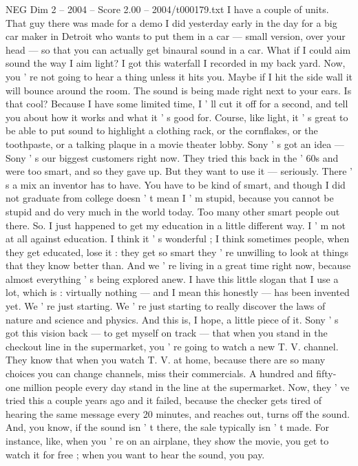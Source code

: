 \begin{textsample}{NEG Dim 2 – 2004 – Score 2.00 – 2004/t000179.txt}
I have a couple of units.
That guy there was made for a demo I did yesterday early in the day for a big car maker in Detroit who wants to put them in a car — small version, over your head — so that you can actually get binaural sound in a car.
What if I could aim sound the way I aim light?
I got this waterfall I recorded in my back yard.
Now, you ' re not going to hear a thing unless it hits you.
Maybe if I hit the side wall it will bounce around the room.
The sound is being made right next to your ears.
Is that cool?
Because I have some limited time, I ' ll cut it off for a second, and tell you about how it works and what it ' s good for.
Course, like light, it ' s great to be able to put sound to highlight a clothing rack, or the cornflakes, or the toothpaste, or a talking plaque in a movie theater lobby.
Sony ' s got an idea — Sony ' s our biggest customers right now.
They tried this back in the ' 60s and were too smart, and so they gave up.
But they want to use it — seriously.
There ' s a mix an inventor has to have.
You have to be kind of smart, and though I did not graduate from college doesn ' t mean I ' m stupid, because you cannot be stupid and do very much in the world today.
Too many other smart people out there.
So.
I just happened to get my education in a little different way.
I ' m not at all against education.
I think it ' s wonderful ; I think sometimes people, when they get educated, lose it : they get so smart they ' re unwilling to look at things that they know better than.
And we ' re living in a great time right now, because almost everything ' s being explored anew.
I have this little slogan that I use a lot, which is : virtually nothing — and I mean this honestly — has been invented yet.
We ' re just starting.
We ' re just starting to really discover the laws of nature and science and physics.
And this is, I hope, a little piece of it.
Sony ' s got this vision back — to get myself on track — that when you stand in the checkout line in the supermarket, you ' re going to watch a new T.
V. channel.
They know that when you watch T.
V. at home, because there are so many choices you can change channels, miss their commercials.
A hundred and fifty- one million people every day stand in the line at the supermarket.
Now, they ' ve tried this a couple years ago and it failed, because the checker gets tired of hearing the same message every 20 minutes, and reaches out, turns off the sound.
And, you know, if the sound isn ' t there, the sale typically isn ' t made.
For instance, like, when you ' re on an airplane, they show the movie, you get to watch it for free ; when you want to hear the sound, you pay.

\end{textsample}
